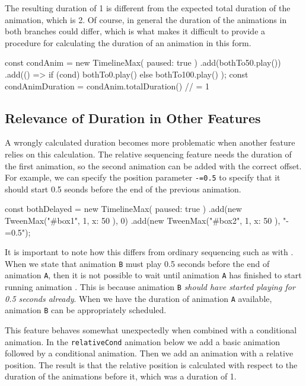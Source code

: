 The resulting duration of 1 is different from the expected total duration of the animation, which is 2. Of course, in general the duration of the animations in both branches could differ, which is what makes it difficult to provide a procedure for calculating the duration of an animation in this form.

\begin{js}
const condAnim = new TimelineMax({ paused: true })
  .add(bothTo50.play())
  .add(() => { if (cond) { bothTo0.play()   }
               else      { bothTo100.play() } });
const condAnimDuration = condAnim.totalDuration() // = 1
\end{js}

\subsection{Relevance of Duration in Other Features}

A wrongly calculated duration becomes more problematic when another feature relies on this calculation. The relative sequencing feature needs the duration of the first animation, so the second animation can be added with the correct offset. For example, we can specify the position parameter \texttt{-=0.5} to specify that it should start 0.5 seonds before the end of the previous animation.

\begin{js}
const bothDelayed = new TimelineMax({ paused: true })
  .add(new TweenMax("#box1", 1, { x: 50 }), 0)
  .add(new TweenMax("#box2", 1, { x: 50 }), "-=0.5");
\end{js}


It is important to note how this differs from ordinary sequencing such as with . When we state that animation \texttt{B} must play 0.5 seconds before the end of animation \texttt{A}, then it is not possible to wait until animation \texttt{A} has finished to start running animation . This is because animation \texttt{B} \emph{should have started playing for 0.5 seconds already}. When we have the duration of animation \texttt{A} available, animation \texttt{B} can be appropriately scheduled.

This feature behaves somewhat unexpectedly when combined with a
conditional animation. In the \texttt{relativeCond} animation below we add a
basic animation followed by a conditional animation. Then we add an animation
with a relative position. The result is that the relative position is
calculated with respect to the duration of the animations before it, which was
a duration of 1.

